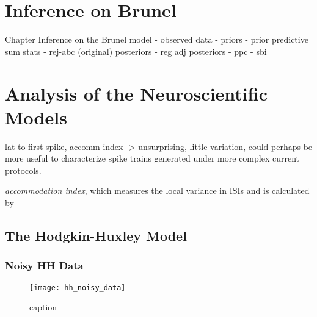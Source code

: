 
\chapter{Inference on Brunel}\label{chap:res_brunel}

Chapter Inference on the Brunel model
- observed data 
- priors
- prior predictive sum stats 
- rej-abc (original) posteriors 
- reg adj posteriors
- ppc 
- sbi



\chapter{Analysis of the Neuroscientific Models}

lat to first spike, accomm index -> unsurprising, little variation, could perhaps be more useful to characterize spike trains generated under more complex current protocols. 




\textit{accommodation index}, which measures the local variance in ISIs and is calculated by


\section{The Hodgkin-Huxley Model}




\subsection{Noisy HH Data}

\begin{figure}[H]
    \centering
    \texttt{[image: hh\_noisy\_data]}
    \caption{caption}
    \label{fig:fig1}
\end{figure} 


